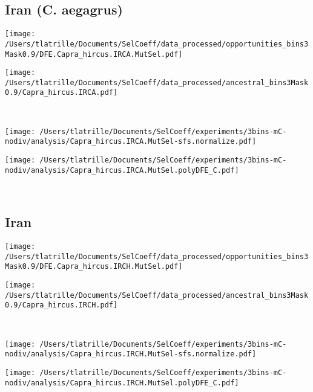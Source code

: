 \documentclass{article}
\begin{document}
    \subsection{Iran (C. aegagrus)}

    \begin{minipage}{0.49\linewidth}
        \texttt{[image: /Users/tlatrille/Documents/SelCoeff/data\_processed/opportunities\_bins3Mask0.9/DFE.Capra\_hircus.IRCA.MutSel.pdf]}
    \end{minipage}
    \begin{minipage}{0.49\linewidth}
        \texttt{[image: /Users/tlatrille/Documents/SelCoeff/data\_processed/ancestral\_bins3Mask0.9/Capra\_hircus.IRCA.pdf]}
    \end{minipage}
    \\
    \begin{minipage}{0.49\linewidth}
        \texttt{[image: /Users/tlatrille/Documents/SelCoeff/experiments/3bins-mC-nodiv/analysis/Capra\_hircus.IRCA.MutSel-sfs.normalize.pdf]}
    \end{minipage}
    \begin{minipage}{0.49\linewidth}
        \texttt{[image: /Users/tlatrille/Documents/SelCoeff/experiments/3bins-mC-nodiv/analysis/Capra\_hircus.IRCA.MutSel.polyDFE\_C.pdf]}
    \end{minipage}
    \\
    \subsection{Iran}

    \begin{minipage}{0.49\linewidth}
        \texttt{[image: /Users/tlatrille/Documents/SelCoeff/data\_processed/opportunities\_bins3Mask0.9/DFE.Capra\_hircus.IRCH.MutSel.pdf]}
    \end{minipage}
    \begin{minipage}{0.49\linewidth}
        \texttt{[image: /Users/tlatrille/Documents/SelCoeff/data\_processed/ancestral\_bins3Mask0.9/Capra\_hircus.IRCH.pdf]}
    \end{minipage}
    \\
    \begin{minipage}{0.49\linewidth}
        \texttt{[image: /Users/tlatrille/Documents/SelCoeff/experiments/3bins-mC-nodiv/analysis/Capra\_hircus.IRCH.MutSel-sfs.normalize.pdf]}
    \end{minipage}
    \begin{minipage}{0.49\linewidth}
        \texttt{[image: /Users/tlatrille/Documents/SelCoeff/experiments/3bins-mC-nodiv/analysis/Capra\_hircus.IRCH.MutSel.polyDFE\_C.pdf]}
    \end{minipage}
    \\
\end{document}

